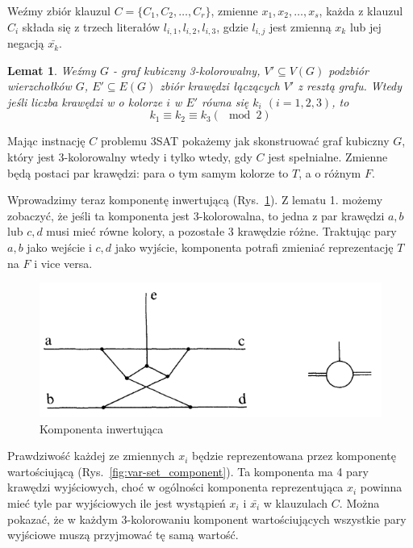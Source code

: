 \documentclass[12pt]{article}
\newtheorem{lemma}{Lemat}
\begin{document}
Weźmy zbiór klauzul $C = \{C_1, C_2, \dots, C_r\}$, zmienne $x_1, x_2, \dots, x_s$, każda z klauzul $C_i$ składa się z trzech literałów $l_{i,1},l_{i,2},l_{i,3}$, gdzie $l_{i,j}$ jest zmienną $x_k$ lub jej negacją $\bar{x_k}$.

\begin{lemma}
    Weźmy $G$ {-} graf kubiczny 3-kolorowalny, $V' \subseteq V(G)$ podzbiór wierzchołków $G$, $E' \subseteq E(G)$ zbiór krawędzi łączących $V'$ z resztą grafu. Wtedy jeśli liczba krawędzi w o kolorze $i$ w $E'$ równa się $k_i$ $(i = 1,2,3)$, to
    \[k_1 \equiv k_2 \equiv k_3(\mod2)\] 
\end{lemma}

Mając instnację $C$ problemu 3SAT pokażemy jak skonstruować graf kubiczny $G$, który jest 3-kolorowalny wtedy i tylko wtedy, gdy $C$ jest spełnialne. Zmienne będą postaci par krawędzi: para o tym samym kolorze to $T$, a o różnym $F$.

Wprowadzimy teraz komponentę inwertującą (Rys.~\ref{fig:inv_component}). Z lematu 1. możemy zobaczyć, że jeśli ta komponenta jest 3-kolorowalna, to jedna z par krawędzi $a,b$ lub $c,d$ musi mieć równe kolory, a pozostałe 3 krawędzie różne. Traktując pary $a,b$ jako wejście i $c,d$ jako wyjście, komponenta potrafi zmieniać reprezentację $T$ na $F$ i vice versa.

\begin{figure}[H]
    \centering
    \includegraphics[scale=1]{inverting_component.PNG}
    \caption{Komponenta inwertująca}
\label{fig:inv_component}
\end{figure}

Prawdziwość każdej ze zmiennych $x_i$ będzie reprezentowana przez komponentę wartościującą (Rys.~\ref{fig:var-set_component}). Ta komponenta ma 4 pary krawędzi wyjściowych, choć w ogólności komponenta reprezentująca $x_i$ powinna mieć tyle par wyjściowych ile jest wystąpień $x_i$ i $\bar{x_i}$ w klauzulach $C$. Można pokazać, że w każdym 3-kolorowaniu komponent wartościujących wszystkie pary wyjściowe muszą przyjmować tę samą wartość.
\end{document}
